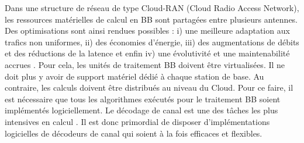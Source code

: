 Dans une structure de réseau de type Cloud-RAN (Cloud Radio Access Network), les ressources matérielles de calcul en BB sont partagées entre plusieurs antennes. Des optimisations sont ainsi rendues possibles : i) une meilleure adaptation aux trafics non uniformes, ii) des économies d'énergie, iii) des augmentations de débits et des réductions de la latence et enfin iv) une évolutivité et une maintenabilité accrues \cite{checko_cloud_2015}. Pour cela, les unités de traitement BB doivent être virtualisées. Il ne doit plus y avoir de support matériel dédié à chaque station de base. Au contraire, les calculs doivent être distribués au niveau du Cloud. Pour ce faire, il est nécessaire que tous les algorithmes exécutés pour le traitement BB soient implémentés logiciellement. Le décodage de canal est une des tâches les plus intensives en calcul \cite{rodriguez_towards_2017,nikaein_processing_2015}. Il est donc primordial de disposer d'implémentations logicielles de décodeurs de canal qui soient à la fois efficaces et flexibles.

